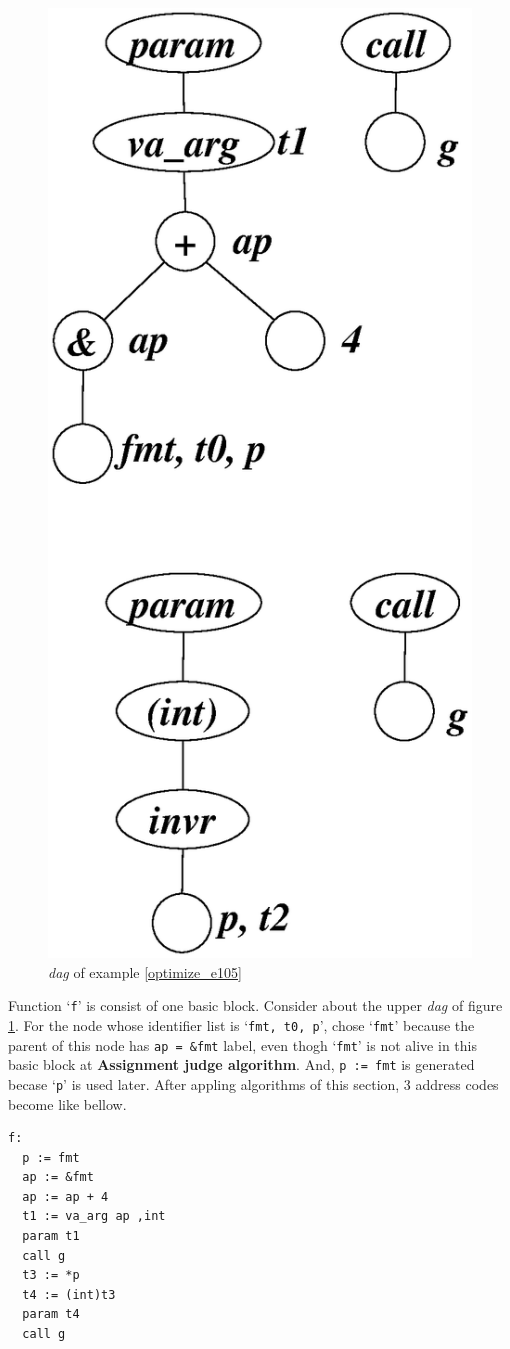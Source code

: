 \begin{Example}
\begin{figure}[htbp]
\begin{center}
\begin{latexonly}
\includegraphics[width=0.546\linewidth,height=1.2\linewidth]{opt046.eps}
\end{latexonly}
\caption{{\em dag} of example \ref{optimize_e105}}
\label{optimize_e106}
\end{center}
\end{figure}
Function `{\tt{f}}' is consist of one basic block. Consider about
the upper {\em dag} of figure \ref{optimize_e106}.
For the node whose identifier list is `{\tt{fmt, t0, p}}',
chose `{\tt{fmt}}' because the parent of this node has 
{\tt{ap = \&fmt}} label, even thogh `{\tt{fmt}}' is not alive
in this basic block at {\bf Assignment judge algorithm}.
And, {\tt{p := fmt}} is generated becase `{\tt{p}}' is used later.
After appling algorithms of this section,
3 address codes become like bellow.
\begin{verbatim}
f:
  p := fmt
  ap := &fmt
  ap := ap + 4
  t1 := va_arg ap ,int
  param t1
  call g
  t3 := *p
  t4 := (int)t3
  param t4
  call g
\end{verbatim}
\end{Example}
